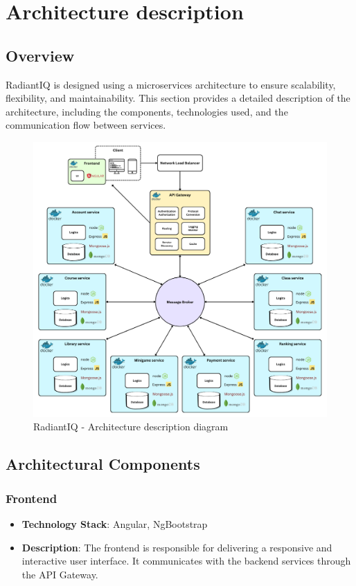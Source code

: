 \section{Architecture description} \label{architecture_description}

\subsection{Overview}

RadiantIQ is designed using a microservices architecture to ensure scalability, flexibility, and maintainability. This section provides a detailed description of the architecture, including the components, technologies used, and the communication flow between services.

\begin{figure}[H]
	\centering
	\includegraphics[width=1.0\linewidth]{images/architecture-description.png}
	\caption{RadiantIQ - Architecture description diagram}
	\label{fig:architecture-description}
\end{figure}

\subsection{Architectural Components}

\subsubsection{Frontend}
\begin{itemize}
    \item \textbf{Technology Stack}: Angular, NgBootstrap
    \item \textbf{Description}: The frontend is responsible for delivering a responsive and interactive user interface. It communicates with the backend services through the API Gateway.
\end{itemize}

